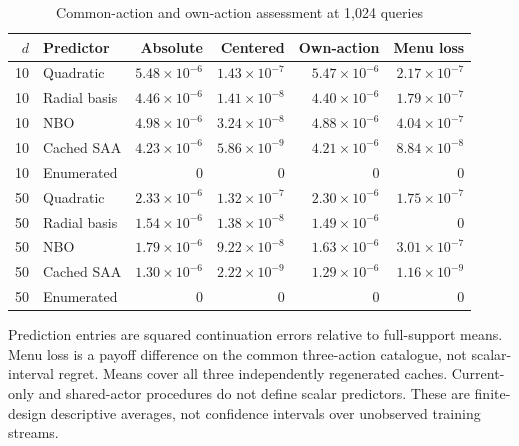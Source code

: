 \begin{table}[htbp]
\centering\small
\caption{Common-action and own-action assessment at 1,024 queries}\label{tab:r19risk}
\begin{tabular}{rlrrrr}
\toprule
$d$ & Predictor & Absolute & Centered & Own-action & Menu loss\\
\midrule
10 & Quadratic & $5.48\times10^{-6}$ & $1.43\times10^{-7}$ & $5.47\times10^{-6}$ & $2.17\times10^{-7}$\\
10 & Radial basis & $4.46\times10^{-6}$ & $1.41\times10^{-8}$ & $4.40\times10^{-6}$ & $1.79\times10^{-7}$\\
10 & NBO & $4.98\times10^{-6}$ & $3.24\times10^{-8}$ & $4.88\times10^{-6}$ & $4.04\times10^{-7}$\\
10 & Cached SAA & $4.23\times10^{-6}$ & $5.86\times10^{-9}$ & $4.21\times10^{-6}$ & $8.84\times10^{-8}$\\
10 & Enumerated & $0$ & $0$ & $0$ & $0$\\
50 & Quadratic & $2.33\times10^{-6}$ & $1.32\times10^{-7}$ & $2.30\times10^{-6}$ & $1.75\times10^{-7}$\\
50 & Radial basis & $1.54\times10^{-6}$ & $1.38\times10^{-8}$ & $1.49\times10^{-6}$ & $0$\\
50 & NBO & $1.79\times10^{-6}$ & $9.22\times10^{-8}$ & $1.63\times10^{-6}$ & $3.01\times10^{-7}$\\
50 & Cached SAA & $1.30\times10^{-6}$ & $2.22\times10^{-9}$ & $1.29\times10^{-6}$ & $1.16\times10^{-9}$\\
50 & Enumerated & $0$ & $0$ & $0$ & $0$\\
\bottomrule
\end{tabular}
\par\smallskip\begin{minipage}{.96\textwidth}\footnotesize Prediction entries are squared continuation errors relative to full-support means. Menu loss is a payoff difference on the common three-action catalogue, not scalar-interval regret. Means cover all three independently regenerated caches. Current-only and shared-actor procedures do not define scalar predictors. These are finite-design descriptive averages, not confidence intervals over unobserved training streams.\end{minipage}
\end{table}
